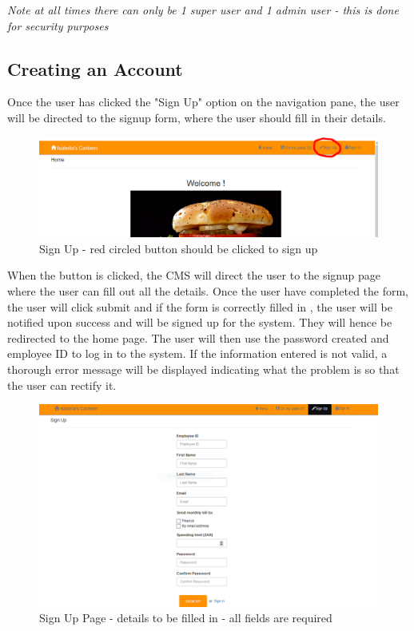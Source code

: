\documentclass[a4paper,12pt]{report}
\begin{document}
{\em* Note at all times there can only be 1 super user and 1 admin user - this is done for security purposes  } \\
 

\subsection{Creating an Account} 
Once the user has clicked the "Sign Up" option on the navigation pane, the user will be directed to the signup form, where the user should fill in their details. 

\begin{figure}[H]
  \centering
    \includegraphics[width=1.0\textwidth]{screenshots/signUp.PNG}
    \caption{Sign Up - red circled button should be clicked to sign up} 
\end{figure}

When the button is clicked, the CMS will direct the user to the signup page where the user can fill out all the details. Once the user have completed the form, the user will click submit and if the form is correctly filled in , the user will be notified upon success and will be signed up for the system. They will hence be redirected to the home page. The user will then use the password created and employee ID to log in to the system. If the information entered is not valid, a thorough error message will be displayed indicating what the problem is so that the user can rectify it.

\begin{figure}[H]
  \centering
    \includegraphics[width=1.0\textwidth]{screenshots/signUpPage.PNG}
    \caption{Sign Up Page - details to be filled in - all fields are required} 
\end{figure}
\end{document}
